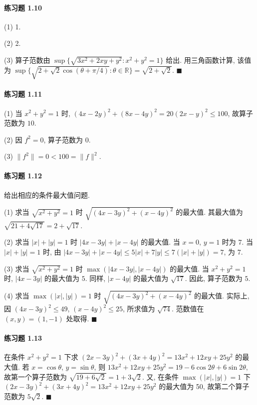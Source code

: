 \paragraph*{练习题 1.10}
(1) 1.

(2) 2.

(3) 算子范数由 $\sup\{\sqrt{3x^{2}+2xy+y^{2}} : x^{2}+y^{2} = 1\}$ 给出. 用三角函数计算, 该值为 $\sup\{\sqrt{2+\sqrt{2}\cos(\theta+\pi/4)} : \theta \in \mathbb{R}\} = \sqrt{2+\sqrt{2}}$. $\blacksquare$

\paragraph*{练习题 1.11}
(1) 当 $x^{2}+y^{2} = 1$ 时, $(4x-2y)^{2}+(8x-4y)^{2} = 20(2x-y)^{2} \leq 100$, 故算子范数为 $10$.

(2) 因 $f^{2} = 0$, 算子范数为 $0$.

(3) $\|f^{2}\| = 0 < 100 = \|f\|^{2}$.

\paragraph*{练习题 1.12}
给出相应的条件最大值问题.

(1) 求当 $\sqrt{x^{2}+y^{2}} = 1$ 时 $\sqrt{(4x-3y)^{2}+(x-4y)^{2}}$ 的最大值. 其最大值为 $\sqrt{21+4\sqrt{17}} = 2+\sqrt{17}$.

(2) 求当 $|x|+|y| = 1$ 时 $|4x-3y|+|x-4y|$ 的最大值. 当 $x = 0$, $y = 1$ 时为 7. 当 $|x|+|y| = 1$ 时, 由 $|4x-3y|+|x-4y| \leq 5|x|+7|y| \leq 7(|x|+|y|) = 7$, 为 7.

(3) 求当 $\sqrt{x^{2}+y^{2}} = 1$ 时 $\max(|4x-3y|, |x-4y|)$ 的最大值. 当 $x^{2}+y^{2} = 1$ 时, $|4x-3y|$ 的最大值为 $5$. 同样, $|x-4y|$ 的最大值为 $\sqrt{17}$. 因此, 算子范数为 $5$.

(4) 求当 $\max(|x|, |y|) = 1$ 时 $\sqrt{(4x-3y)^{2}+(x-4y)^{2}}$ 的最大值. 实际上, 因 $(4x-3y)^{2} \leq 49$, $(x-4y)^{2} \leq 25$, 所求值为 $\sqrt{74}$. 范数值在 $(x,y) = (1,-1)$ 处取得. $\blacksquare$

\paragraph*{练习题 1.13}
在条件 $x^{2}+y^{2} = 1$ 下求 $(2x-3y)^{2}+(3x+4y)^{2} = 13x^{2}+12xy+25y^{2}$ 的最大值. 若 $x = \cos\theta$, $y = \sin\theta$, 则 $13x^{2}+12xy+25y^{2} = 19-6\cos 2\theta+6\sin 2\theta$, 故第一个算子范数为 $\sqrt{19+6\sqrt{2}} = 1+3\sqrt{2}$. 又, 在条件 $\max(|x|, |y|) = 1$ 下 $(2x-3y)^{2}+(3x+4y)^{2} = 13x^{2}+12xy+25y^{2}$ 的最大值为 50, 故第二个算子范数为 $5\sqrt{2}$. $\blacksquare$

